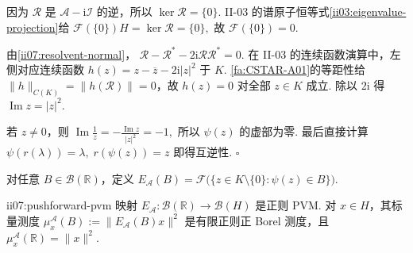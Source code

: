 \begin{FAProof}
因为 \(\displaystyle\mathcal R\) 是 \(\displaystyle\mathcal A-\mathrm{i}\mathcal I\) 的逆，所以 \(\displaystyle\ker\mathcal R=\{0\}\). II-03 的谱原子恒等式\autoref{ii03:eigenvalue-projection}给
\(\displaystyle \mathcal F(\{0\})H=\ker\mathcal R=\{0\},\)
故 \(\displaystyle\mathcal F(\{0\})=0\).

由\autoref{ii07:resolvent-normal}，
\(\displaystyle \mathcal R-\mathcal R^*-2\mathrm{i}\mathcal R\mathcal R^*=0.\)
在 II-03 的连续函数演算中，左侧对应连续函数
\(\displaystyle h(z)=z-\overline z-2\mathrm{i}|z|^2\)
于 \(\displaystyle K\). \autoref{fa:CSTAR-A01}的等距性给 \(\displaystyle\|h\|_{C(K)}=\|h(\mathcal R)\|=0\)，故 \(\displaystyle h(z)=0\) 对全部 \(\displaystyle z\in K\) 成立. 除以 \(\displaystyle2\mathrm{i}\) 得 \(\displaystyle\operatorname{Im}z=|z|^2\).

若 \(\displaystyle z\neq0\)，则
\(\displaystyle \operatorname{Im}\frac1z = -\frac{\operatorname{Im}z}{|z|^2} =-1,\)
所以 \(\displaystyle\psi(z)\) 的虚部为零. 最后直接计算
\(\displaystyle \psi(r(\lambda))=\lambda, \; r(\psi(z))=z\)
即得互逆性.
\hfill\(\square\)
\end{FAProof}

对任意 \(\displaystyle B\in\mathcal B(\mathbb R)\)，定义
\(\displaystyle E_{\mathcal A}(B) = \mathcal F\bigl(\{z\in K\setminus\{0\}:\psi(z)\in B\}\bigr).\)

\begin{FAProposition}[B][由预解投影值测度推送得到自伴谱测度]{ii07:pushforward-pvm}
映射 \(\displaystyle E_{\mathcal A}:\mathcal B(\mathbb R)\to\mathcal B(H)\) 是正则 PVM. 对 \(\displaystyle x\in H\)，其标量测度
\(\displaystyle \mu_x^{\mathcal A}(B) := \|E_{\mathcal A}(B)x\|^2\)
是有限正则正 Borel 测度，且 \(\displaystyle\mu_x^{\mathcal A}(\mathbb R)=\|x\|^2\).
\end{FAProposition}

